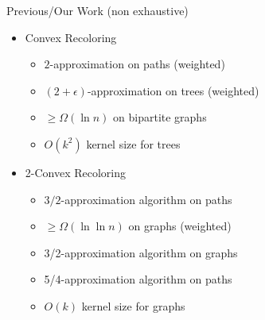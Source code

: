 \begin{frame}{Previous/\alert{Our} Work (non exhaustive)}
\begin{itemize}
\item
Convex Recoloring
\begin{itemize}

\item
$2$-approximation on paths (weighted)

\pause\item
$(2 + \epsilon)$-approximation on trees (weighted)

\pause\item
$\geq \Omega(\ln{n})$ on bipartite graphs

\pause\item
$O(k^2)$ kernel size for trees


\end{itemize}
\pause\item
2-Convex Recoloring
\begin{itemize}


\pause\item
$3/2$-approximation algorithm on paths

\pause\item
$\geq \Omega(\ln\ln{n})$ on graphs (weighted)

\pause\item
\alert{3/2-approximation algorithm on graphs}

\pause\item
\alert{5/4-approximation algorithm on paths}

\pause\item
\alert{$O(k)$ kernel size for graphs}


\end{itemize}
\end{itemize}
\end{frame}